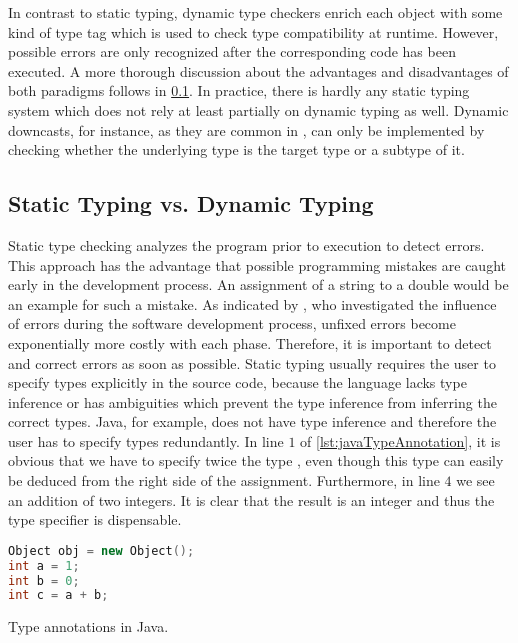 In contrast to static typing, dynamic type checkers enrich each object with some kind of type tag which is used to check type compatibility at runtime.
However, possible errors are only recognized after the corresponding code has been executed.
A more thorough discussion about the advantages and disadvantages of both paradigms follows in \cref{sec:staticVSDynamic}.
In practice, there is hardly any static typing system which does not rely at least partially on dynamic typing as well.
Dynamic downcasts, for instance, as they are common in , can only be implemented by checking whether the underlying type is the target type or a subtype of it.

\subsection{Static Typing vs. Dynamic Typing}
\label{sec:staticVSDynamic}

Static type checking analyzes the program prior to execution to detect errors.
This approach has the advantage that possible programming mistakes are caught early in the development process.
An assignment of a string to a double would be an example for such a mistake.
As indicated by \cite{westland:jss2002a}, who investigated the influence of errors during the software development process, unfixed errors become exponentially more costly with each phase.
Therefore, it is important to detect and correct errors as soon as possible.
Static typing usually requires the user to specify types explicitly in the source code, because the language lacks type inference or has ambiguities which prevent the type inference from inferring the correct types.
Java, for example, does not have type inference and therefore the user has to specify types redundantly.
In line $1$ of \cref{lst:javaTypeAnnotation}, it is obvious that we have to specify twice the type , even though this type can easily be deduced from the right side of the assignment.
Furthermore, in line $4$ we see an addition of two integers.
It is clear that the result is an integer and thus the  type specifier is dispensable.
\begin{listing}[!h]
  \begin{CenteredBox}
    \begin{lstlisting}[language=C++,
      commentstyle=\color{black},
      stringstyle=\color{black},
      keywordstyle=\color{black}\bfseries,
      ]
Object obj = new Object();
int a = 1;
int b = 0;
int c = a + b;      
    \end{lstlisting}
  \end{CenteredBox}
  \caption{Type annotations in Java.}
  \label{lst:javaTypeAnnotation}
\end{listing}

